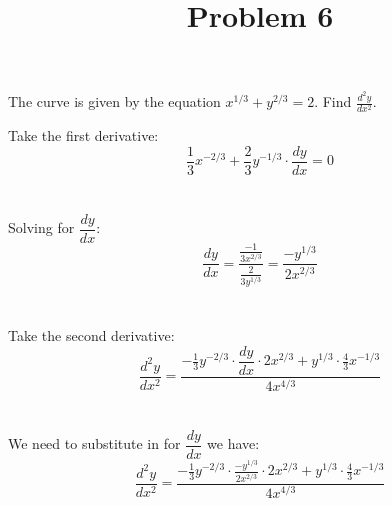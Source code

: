 \documentclass{ximera}
\title[Problem 6]{Problem 6}
\begin{document}
\begin{abstract} \end{abstract}
\maketitle


\begin{problem}

The curve is given by the equation $x^{1/3}+y^{2/3}=2$. Find $\frac{d^2y}{dx^2}$. 
\begin{explanation}	

	Take the first derivative:\\
	 $$\frac{1}{3}x^{-2/3}+\frac{2}{3}y^{-1/3}\cdot \dfrac{dy}{dx}=0 $$ \\\\
	Solving for $\dfrac{dy}{dx}$:\\
	$$\dfrac{dy}{dx}=\frac{\frac{-1}{3x^{2/3}}}{\frac{2}{3y^{1/3}}}=\frac{-y^{1/3}}{2x^{2/3}}$$\\\\
	Take the second derivative:
	$$ \frac{d^2y}{dx^2}= \frac{-\frac{1}{3}y^{-2/3} \cdot \dfrac{dy}{dx} \cdot 2x^{2/3}+y^{1/3}\cdot \frac{4}{3}x^{-1/3}}{4x^{4/3}}$$ \\\\
	We need to substitute in for $\dfrac{dy}{dx}$ we have:\\ 
	$$ \frac{d^2y}{dx^2}= \frac{-\frac{1}{3}y^{-2/3} \cdot \frac{-y^{1/3}}{2x^{2/3}}  \cdot 2x^{2/3}+y^{1/3}\cdot \frac{4}{3}x^{-1/3}}{4x^{4/3}}$$ \\\\
	\end{explanation}
\end{problem}
\end{document}
